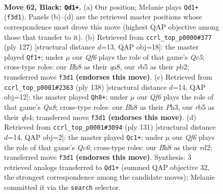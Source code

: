 \documentclass[11pt]{article}
\begin{document}
\clearpage

\begin{figure}[p]\centering
\begin{subfigure}{0.46\textwidth}\centering
\resizebox{\linewidth}{!}{%
\newchessgame
\chessboard[
  setfen={5k1b/5p2/8/1R1P4/8/5q2/8/6K1 b - - 2 62},
  showmover=false,
  pgfstyle=straightmove, color=movearrow, markmove={f3-d1}
]}
\caption{}
\end{subfigure}\hfill
\begin{subfigure}{0.46\textwidth}\centering
\resizebox{\linewidth}{!}{%
\newchessgame
\chessboard[
  setfen={Q7/8/4pk2/8/2q2P2/8/1P6/1K6 b - - 2 64},
  showmover=false,
  pgfstyle=straightmove, color=movearrow, markmove={c4-f1}
]}
\caption{}
\end{subfigure}
\\[4pt]
\begin{subfigure}{0.46\textwidth}\centering
\resizebox{\linewidth}{!}{%
\newchessgame
\chessboard[
  setfen={Q7/8/8/4k3/1q6/p6P/6P1/7K w - - 14 70},
  showmover=false,
  pgfstyle=straightmove, color=movearrow, markmove={a8-h8}
]}
\caption{}
\end{subfigure}\hfill
\begin{subfigure}{0.46\textwidth}\centering
\resizebox{\linewidth}{!}{%
\newchessgame
\chessboard[
  setfen={8/4PR2/6pk/8/8/2q5/3R4/4K3 b - - 10 66},
  showmover=false,
  pgfstyle=straightmove, color=movearrow, markmove={c3-c1}
]}
\caption{}
\end{subfigure}
\caption{\textbf{Move 62, Black: \texttt{Qd1+}.} (a) Our position; Melanie plays \texttt{Qd1+} (\texttt{f3d1}). Panels (b)--(d) are the retrieved master positions whose correspondence most drove this move (highest QAP objective among those that transfer to it). (b) Retrieved from \texttt{ccrl\_top\_p0000\#377} (ply 127) [structural distance $d$=13, QAP obj=18]: the master played \texttt{Qf1+}; under $\mu$ our \emph{Qf6} plays the role of that game's \emph{Qc5}; cross-type roles: our \emph{B}h8 as their \emph{q}a8, our \emph{r}b5 as their \emph{p}b2; transferred move \texttt{f3d1} \textbf{(endorses this move)}. (c) Retrieved from \texttt{ccrl\_top\_p0001\#2363} (ply 138) [structural distance $d$=14, QAP obj=12]: the master played \texttt{Qh8+}; under $\mu$ our \emph{Qf6} plays the role of that game's \emph{Qa8}; cross-type roles: our \emph{B}h8 as their \emph{P}h3, our \emph{r}b5 as their \emph{q}b4; transferred move \texttt{f3d1} \textbf{(endorses this move)}. (d) Retrieved from \texttt{ccrl\_top\_p0001\#3094} (ply 131) [structural distance $d$=14, QAP obj=2]: the master played \texttt{Qc1+}; under $\mu$ our \emph{Qf6} plays the role of that game's \emph{Qc6}; cross-type roles: our \emph{B}h8 as their \emph{r}d2; transferred move \texttt{f3d1} \textbf{(endorses this move)}. Synthesis: 3 retrieved analogs transferred to \texttt{Qd1+} (summed QAP objective 32, the strongest correspondence among the candidate moves); Melanie committed it via the \texttt{search} selector.}
\label{fig:thought-m123}
\end{figure}
\end{document}
